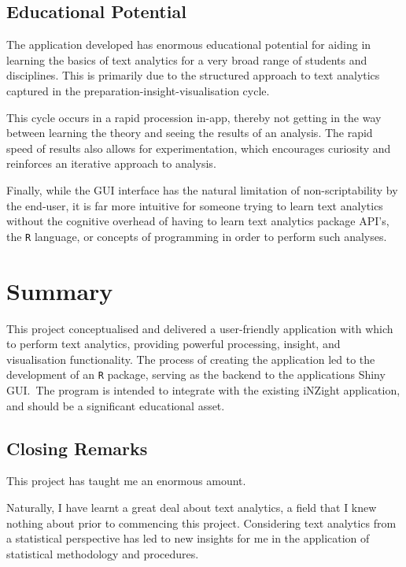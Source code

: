 \documentclass[11pt, a4paper, titlepage]{report}
\begin{document}
\subsection{Educational Potential}

The application developed has enormous educational potential for
aiding in learning the basics of text analytics for a very broad range
of students and disciplines. This is primarily due to the structured
approach to text analytics captured in the
preparation-insight-visualisation cycle.

This cycle occurs in a rapid procession in-app, thereby not getting in
the way between learning the theory and seeing the results of an
analysis. The rapid speed of results also allows for experimentation,
which encourages curiosity and reinforces an iterative approach to
analysis.

Finally, while the GUI interface has the natural limitation of
non-scriptability by the end-user, it is far more intuitive for
someone trying to learn text analytics without the cognitive overhead
of having to learn text analytics package API's, the \texttt{R}
language, or concepts of programming in order to perform such
analyses.

\section{Summary}\label{sec:summary}

This project conceptualised and delivered a user-friendly application
with which to perform text analytics, providing powerful processing,
insight, and visualisation functionality. The process of creating the
application led to the development of an \texttt{R} package, serving
as the backend to the applications Shiny GUI.\ The program is intended
to integrate with the existing iNZight application, and should be a
significant educational asset.

\subsection{Closing Remarks}

This project has taught me an enormous amount.

Naturally, I have learnt a great deal about text analytics, a field
that I knew nothing about prior to commencing this project.
Considering text analytics from a statistical perspective has led to
new insights for me in the application of statistical methodology and
procedures.
\end{document}
